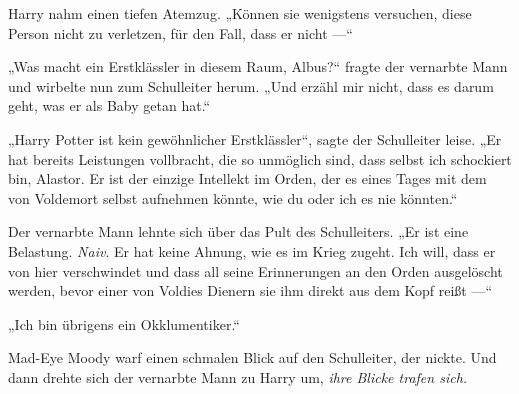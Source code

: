 Harry nahm einen tiefen Atemzug.
„Können sie wenigstens versuchen, diese Person nicht zu verletzen, für den Fall, dass er nicht —“

„Was macht ein Erstklässler in diesem Raum, Albus?“ fragte der vernarbte Mann und wirbelte nun zum Schulleiter herum.
„Und erzähl mir nicht, dass es darum geht, was er als Baby getan hat.“

„Harry Potter ist kein gewöhnlicher Erstklässler“, sagte der Schulleiter leise.
„Er hat bereits Leistungen vollbracht, die so unmöglich sind, dass selbst ich schockiert bin, Alastor. Er ist der einzige Intellekt im Orden, der es eines Tages mit dem von Voldemort selbst aufnehmen könnte, wie du oder ich es nie könnten.“

Der vernarbte Mann lehnte sich über das Pult des Schulleiters.
„Er ist eine Belastung. \emph{Naiv}. Er hat keine Ahnung, wie es im Krieg zugeht. Ich will, dass er von hier verschwindet und dass all seine Erinnerungen an den Orden ausgelöscht werden, bevor einer von Voldies Dienern sie ihm direkt aus dem Kopf reißt —“

„Ich bin übrigens ein Okklumentiker.“

Mad-Eye Moody warf einen schmalen Blick auf den Schulleiter, der nickte.
Und dann drehte sich der vernarbte Mann zu Harry um, \emph{ihre Blicke trafen sich.}

